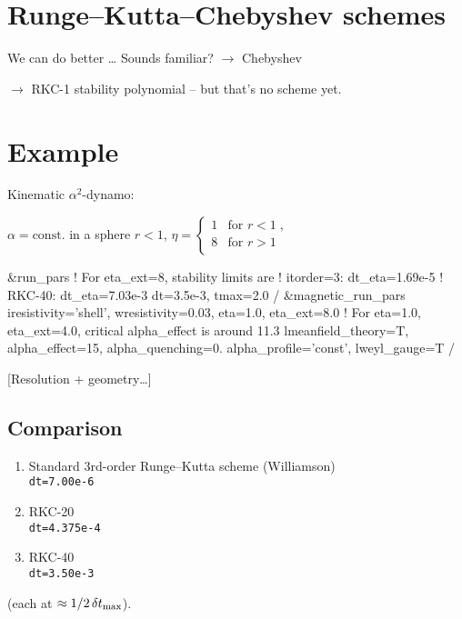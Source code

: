 \documentclass[\mydriver,12pt,twoside,notitlepage]{article}
\newcommand{\BoxLabel}[1]{\fbox{\rmfamily\emph{#1}}}
\begin{document}
\section{Runge--Kutta--Chebyshev schemes}

We can do better \ldots{}
Sounds familiar? $\rightarrow$ Chebyshev

$\rightarrow$ RKC-1 stability polynomial
-- but that's no scheme yet.



\section{Example}

Kinematic $\alpha^2$-dynamo:

$\alpha=\mathrm{const.}$ in a sphere $r<1$,
\qquad
$\eta = \begin{cases}
    1 & \text{for $r<1$} \; , \\
    8 & \text{for $r>1$}\\
  \end{cases}$

\medskip

{\small\color{DarkBlue}
\begin{CodeVerbatim}[label=\BoxLabel{run.in}]
  &run_pars
    ! For eta_ext=8, stability limits are
    !   itorder=3:  dt_eta=1.69e-5
    !   RKC-40:     dt_eta=7.03e-3
    dt=3.5e-3, tmax=2.0
  /
  &magnetic_run_pars
    iresistivity='shell', wresistivity=0.03,
    eta=1.0, eta_ext=8.0
    ! For eta=1.0, eta_ext=4.0, critical alpha_effect is around 11.3
    lmeanfield_theory=T, alpha_effect=15, alpha_quenching=0.
    alpha_profile='const', lweyl_gauge=T
  /
\end{CodeVerbatim}
}

[Resolution + geometry\ldots]


\subsection{Comparison}
\begin{enumerate}
\item Standard 3rd-order Runge--Kutta scheme (Williamson)\\
  \texttt{dt=7.00e-6}
\item RKC-20\\
  \texttt{dt=4.375e-4}
\item RKC-40\\
  \texttt{dt=3.50e-3}
\end{enumerate}
(each at $\approx 1/2\,\delta t_{\rm max}$).
\end{document}
